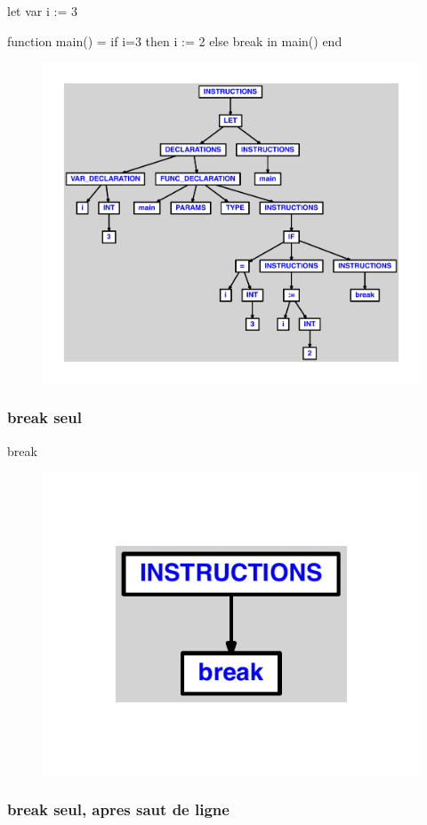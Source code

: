 \documentclass{article}
\begin{document}
\begin{verbatimtab}
let
	var i := 3

	function main() =
		if i=3 then
			i := 2
		else
			break
in main() end
\end{verbatimtab}
\begin{figure}[H]\centering\includegraphics[max width=\textwidth]{ast/ast_19.pdf}\end{figure}\subsubsection{break seul}
\begin{verbatimtab}
break
\end{verbatimtab}
\begin{figure}[H]\centering\includegraphics[max width=\textwidth]{ast/ast_20.pdf}\end{figure}\subsubsection{break seul, apres saut de ligne}
\end{document}
